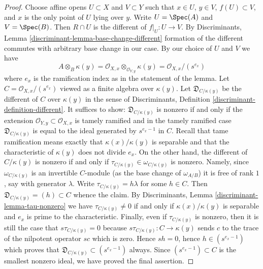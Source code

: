 \begin{proof}
\medskip\noindent
Choose affine opens $U \subset X$ and $V \subset Y$
such that $x \in U$, $y \in V$, $f(U) \subset V$, and $x$ is the only
point of $U$ lying over $y$. Write $U = \Spec(A)$ and $V = \Spec(B)$.
Then $R \cap U$ is the different of $f|_U : U \to V$.
By Discriminants, Lemma \ref{discriminant-lemma-base-change-different}
formation of the different commutes with arbitrary base change
in our case. By our choice of $U$ and $V$ we have
$$
A \otimes_B \kappa(y) =
\mathcal{O}_{X, x} \otimes_{\mathcal{O}_{Y, y}} \kappa(y) =
\mathcal{O}_{X, x}/(s^{e_x})
$$
where $e_x$ is the ramification index as in the statement of the lemma.
Let $C = \mathcal{O}_{X, x}/(s^{e_x})$ viewed as a finite algebra
over $\kappa(y)$. Let $\mathfrak{D}_{C/\kappa(y)}$ be the different
of $C$ over $\kappa(y)$ in the sense of
Discriminants, Definition \ref{discriminant-definition-different}.
It suffices to show: $\mathfrak{D}_{C/\kappa(y)}$
is nonzero if and only if the extension
$\mathcal{O}_{Y, y} \subset \mathcal{O}_{X, x}$ is tamely ramified
and in the tamely ramified case $\mathfrak{D}_{C/\kappa(y)}$
is equal to the ideal generated by $s^{e_x - 1}$ in $C$.
Recall that tame ramification means exactly that $\kappa(x)/\kappa(y)$
is separable and that the characteristic of $\kappa(y)$ does not
divide $e_x$. On the other hand, the different of $C/\kappa(y)$ is nonzero
if and only if $\tau_{C/\kappa(y)} \in \omega_{C/\kappa(y)}$ is nonzero.
Namely, since $\omega_{C/\kappa(y)}$ is an invertible $C$-module
(as the base change of $\omega_{A/B}$)
it is free of rank $1$, say with generator $\lambda$. Write
$\tau_{C/\kappa(y)} = h\lambda$ for some $h \in C$. Then
$\mathfrak{D}_{C/\kappa(y)} = (h) \subset C$ whence the claim.
By Discriminants, Lemma \ref{discriminant-lemma-tau-nonzero}
we have $\tau_{C/\kappa(y)} \not = 0$
if and only if $\kappa(x)/\kappa(y)$
is separable and $e_x$ is prime to the characteristic.
Finally, even if $\tau_{C/\kappa(y)}$ is nonzero, then
it is still the case that $s \tau_{C/\kappa(y)} = 0$
because $s\tau_{C/\kappa(y)} : C \to \kappa(y)$
sends $c$ to the trace of the nilpotent operator $sc$ which is zero.
Hence $sh = 0$, hence $h \in (s^{e_x - 1})$ which proves
that $\mathfrak{D}_{C/\kappa(y)} \subset (s^{e_x - 1})$ always.
Since $(s^{e_x - 1}) \subset C$ is the smallest nonzero ideal,
we have proved the final assertion.
\end{proof}